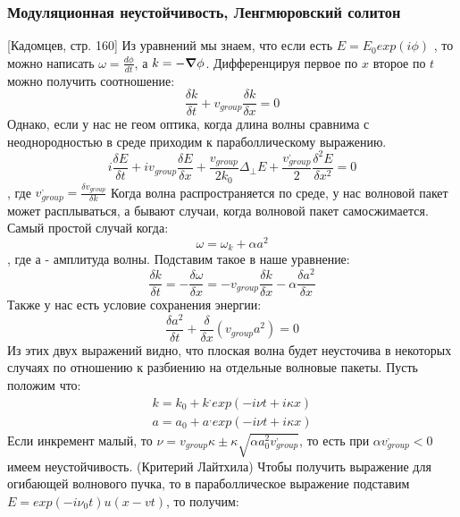 \documentclass[10pt, a4paper]{article}
\begin{document}
\subsubsection{Модуляционная неустойчивость, Ленгмюровский солитон}
[Кадомцев, стр. 160]
Из уравнений мы знаем, что если есть $E=E_0 exp (i \phi)$ , то можно написать $\omega=\frac{d \phi}{dt}$, а $k=- \grad \phi$. Дифференцируя первое по $x$ второе по $t$ можно получить соотношение:
\begin{equation}
	\frac{\delta k}{\delta t} + v_{group} \frac{\delta k}{\delta x}=0
\end{equation}
Однако, если у нас не геом оптика, когда длина волны сравнима с неоднородностью в среде приходим к параболлическому выражению.
\begin{equation}
	i  \frac{\delta E}{\delta t} + i v_{group} \frac{\delta E}{\delta x} + \frac{v_{group}}{2 k_0} \Delta_{\perp} E + \frac{v^{,}_{group}}{2}  \frac{\delta^2 E}{\delta x^2}=0
\end{equation}
, где $v^{,}_{group}=\frac{\delta v_{group}}{\delta k}$ 
Когда волна распространяется по среде, у нас волновой пакет может расплываться, а бывают случаи, когда волновой пакет самосжимается.
Самый простой случай когда:
\begin{equation}
	\omega=\omega_k + \alpha a^2
\end{equation}
, где а - амплитуда волны. Подставим такое в наше уравнение:
\begin{equation}
	\frac{\delta k}{\delta t} = - \frac{\delta \omega}{\delta x}=-v_{group} \frac{\delta k}{\delta x} - \alpha \frac{\delta a^{2}}{\delta x}
\end{equation}
Также у нас есть условие сохранения энергии:
\begin{equation}
	\frac{\delta a^{2}}{\delta t} + \frac{\delta }{\delta x} (v_{group} a^2)=0 
\end{equation}
Из этих двух выражений видно, что плоская волна будет неусточива в некоторых случаях по отношению к разбиению на отдельные волновые пакеты. Пусть положим что:
\begin{align*}
	k=k_0 + k^{,} exp(-i \nu t + i \kappa x) \\
	a=a_0 + a^{,} exp(-i \nu t + i \kappa x) 
\end{align*}
Если инкремент малый, то $\nu=v_{group} \kappa \pm \kappa \sqrt{\alpha a^2_0 v^{,}_{group}}$, то есть при $\alpha v^{,}_{group} < 0$ имеем неустойчивость. (Критерий Лайтхила)
\label{subsubsec:Laitleh_crit}
Чтобы получить выражение для огибающей волнового пучка, то в параболлическое выражение подставим $E=exp(-i \nu_0 t) u(x-vt)$, то получим:
\end{document}
